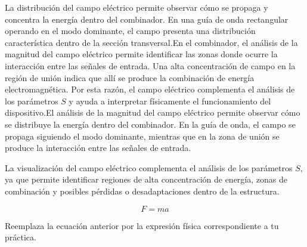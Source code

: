 La distribución del campo eléctrico permite observar cómo se propaga y concentra la energía dentro del combinador. En una guía de onda rectangular operando en el modo dominante, el campo presenta una distribución característica dentro de la sección transversal.En el combinador, el análisis de la magnitud del campo eléctrico permite identificar las zonas donde ocurre la interacción entre las señales de entrada. Una alta concentración de campo en la región de unión indica que allí se produce la combinación de energía electromagnética. Por esta razón, el campo eléctrico complementa el análisis de los parámetros $S$ y ayuda a interpretar físicamente el funcionamiento del dispositivo.El análisis de la magnitud del campo eléctrico permite observar cómo se distribuye la energía dentro del combinador. En la guía de onda, el campo se propaga siguiendo el modo dominante, mientras que en la zona de unión se produce la interacción entre las señales de entrada.

La visualización del campo eléctrico complementa el análisis de los parámetros $S$, ya que permite identificar regiones de alta concentración de energía, zonas de combinación y posibles pérdidas o desadaptaciones dentro de la estructura.

\begin{equation}
    F = ma
\end{equation}

Reemplaza la ecuación anterior por la expresión física correspondiente a tu práctica.
